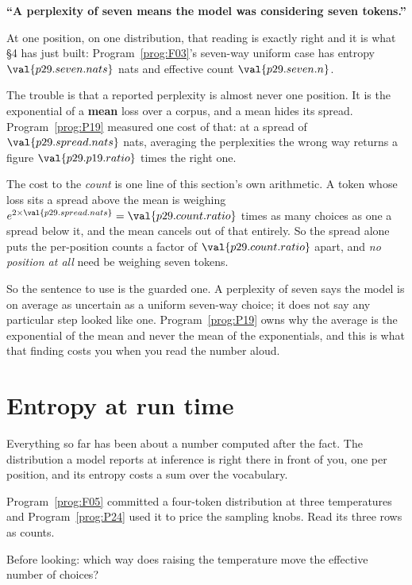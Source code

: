 \begin{fr}
\begin{trapbox}
\textbf{\enquote{A perplexity of seven means the model was considering seven
tokens.}}

At one position, on one distribution, that reading is exactly right and it is
what §4 has just built: Program~\ref{prog:F03}'s seven-way uniform case has
entropy $\val{p29.seven.nats}$ nats and effective count $\val{p29.seven.n}$.

The trouble is that a reported perplexity is almost never one position. It is
the exponential of a \textbf{mean} loss over a corpus, and a mean hides its
spread. Program~\ref{prog:P19} measured one cost of that: at a spread of
$\val{p29.spread.nats}$ nats, averaging the perplexities the wrong way returns
a figure $\val{p29.p19.ratio}$ times the right one.

The cost to the \emph{count} is one line of this section's own arithmetic. A
token whose loss sits a spread above the mean is weighing
$e^{2 \times \val{p29.spread.nats}} = \val{p29.count.ratio}$ times as many
choices as one a spread below it, and the mean cancels out of that entirely.
So the spread alone puts the per-position counts a factor of
$\val{p29.count.ratio}$ apart, and \emph{no position at all} need be weighing
seven tokens.

So the sentence to use is the guarded one. A perplexity of seven says the
model is on average as uncertain as a uniform seven-way choice; it does not
say any particular step looked like one. Program~\ref{prog:P19} owns why the
average is the exponential of the mean and never the mean of the
exponentials, and this is what that finding costs you when you read the
number aloud.
\end{trapbox}
\end{fr}

\section{Entropy at run time}
\label{sec:P29-runtime}

\begin{fr}
Everything so far has been about a number computed after the fact. The
distribution a model reports at inference is right there in front of you, one
per position, and its entropy costs a sum over the vocabulary.

Program~\ref{prog:F05} committed a four-token distribution at three
temperatures and Program~\ref{prog:P24} used it to price the sampling knobs.
Read its three rows as counts.

Before looking: which way does raising the temperature move the effective
number of choices?
\dotline
\nextframe
\end{fr}

